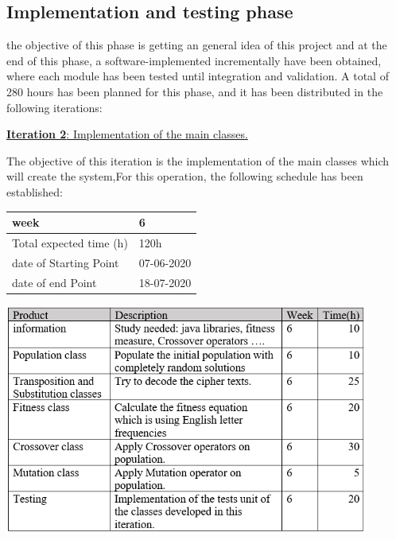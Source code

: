 \subsection{Implementation and testing phase}

the objective of this phase is getting an general idea of this project and at the end of this phase, a software-implemented incrementally have been obtained, where each module has been tested until integration and validation.
A total of 280 hours has been planned for this phase, and it has been distributed in the following iterations:

\large{\underline{\textbf{Iteration 2}: Implementation of the main classes.}}
\vspace{0.3cm}

The objective of this iteration is the implementation of the main classes  which will create the system,For this operation, the following schedule has been established:

\begin{table}[h!]
    \centering
    \begin{tabular}{|p{5cm}|p{4cm}|}
     \hline
        \cellcolor[gray]{0.9} week  & 6\\ \hline
        \cellcolor[gray]{0.9} Total expected time (h)  & 120h \\ \hline
        \cellcolor[gray]{0.9} date of Starting Point  & 07-06-2020 \\ \hline
        \cellcolor[gray]{0.9} date of end Point  & 18-07-2020 \\ \hline
            
\end{tabular}
\end{table}

\includegraphics[width=0.9\textwidth]{imagenes/it2.png}\\[1.4cm]

